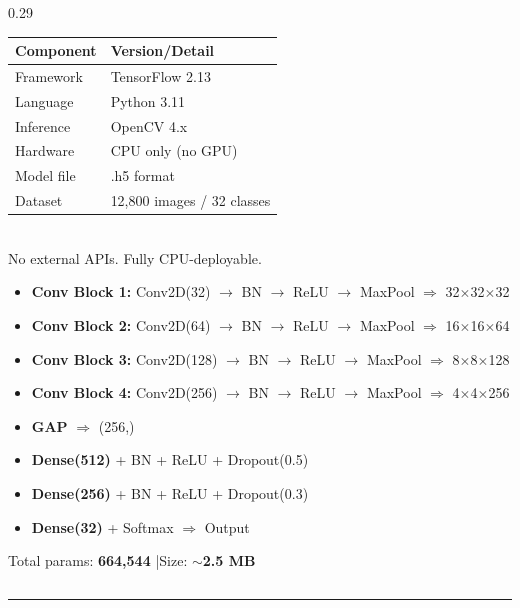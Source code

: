 \documentclass[final]{beamer}
\newcommand{\seccard}[2]{%
  \begin{tcolorbox}[postercard, title={#1}]#2\end{tcolorbox}%
}
\renewcommand{\scriptsize}{\fontsize{8}{9.5}\selectfont}
\begin{document}
\begin{frame}[t]{}
\begin{tcolorbox}[
  enhanced,
  colback=white,
  colframe=upesblue,
  boxrule=4pt,
  arc=0pt,
  left=10pt, right=10pt, top=10pt, bottom=10pt,
  width=\textwidth,
]
\begin{columns}[T]
\begin{column}{0.29\textwidth}
\vspace{5pt}

\seccard{Reproducibility \& Stack}{
\scriptsize
\begin{tabular}{@{}ll@{}}
\toprule
\textbf{Component} & \textbf{Version/Detail} \\
\midrule
Framework & TensorFlow 2.13 \\
Language & Python 3.11 \\
Inference & OpenCV 4.x \\
Hardware & CPU only (no GPU) \\
Model file & .h5 format \\
Dataset & 12,800 images / 32 classes \\
\bottomrule
\end{tabular}\\[4pt]
No external APIs. Fully CPU-deployable.
}

\vspace{5pt}

\seccard{Model Architecture Summary}{
\scriptsize
\begin{itemize}\setlength\itemsep{2pt}
  \item \textbf{Conv Block 1:} Conv2D(32) $\to$ BN $\to$ ReLU $\to$ MaxPool $\Rightarrow$ 32$\times$32$\times$32
  \item \textbf{Conv Block 2:} Conv2D(64) $\to$ BN $\to$ ReLU $\to$ MaxPool $\Rightarrow$ 16$\times$16$\times$64
  \item \textbf{Conv Block 3:} Conv2D(128) $\to$ BN $\to$ ReLU $\to$ MaxPool $\Rightarrow$ 8$\times$8$\times$128
  \item \textbf{Conv Block 4:} Conv2D(256) $\to$ BN $\to$ ReLU $\to$ MaxPool $\Rightarrow$ 4$\times$4$\times$256
  \item \textbf{GAP} $\Rightarrow$ (256,)
  \item \textbf{Dense(512)} + BN + ReLU + Dropout(0.5)
  \item \textbf{Dense(256)} + BN + ReLU + Dropout(0.3)
  \item \textbf{Dense(32)} + Softmax $\Rightarrow$ Output
\end{itemize}
\vspace{2pt}
Total params: \textbf{664,544} \enspace|\enspace Size: $\sim$\textbf{2.5 MB}
}

\end{column}
\end{columns}

\vspace{8pt}
\noindent\textcolor{upesblue}{\rule{\linewidth}{2pt}}
\vspace{5pt}


\end{tcolorbox}
\end{frame}
\end{document}
